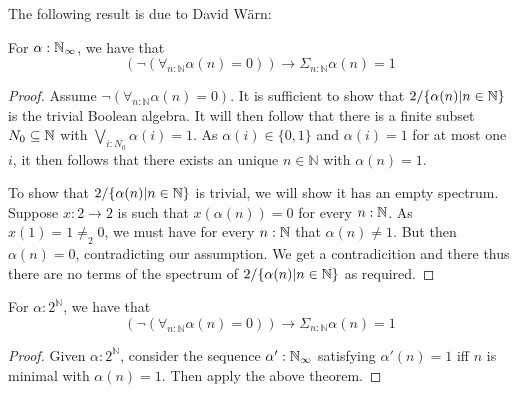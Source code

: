 The following result is due to David W\"arn:
\begin{theorem}\label{MarkovPrincipleThm}
  For $\alpha:\mathbb{N}_{\infty}$, we have that 
  \begin{equation}
    (\neg (\forall_{n:\mathbb N} \alpha (n)= 0)) \to \Sigma_{n:\mathbb N} \alpha (n)= 1
  \end{equation}
\end{theorem}
\begin{proof}
  Assume $\neg (\forall_{n:\mathbb N} \alpha (n)= 0)$.
  It is sufficient to show that $2/\{\alpha(n)|n\in\mathbb{N}\}$ is the trivial Boolean algebra. 
  It will then follow that there is a finite subset $N_0\subseteq \mathbb{N}$ 
  with $\bigvee_{i:N_0} \alpha(i) = 1$.
  As $\alpha(i) \in \{0,1\}$ and $\alpha(i) = 1$ for at most one $i$, it then follows that 
  there exists an unique $n\in\mathbb N$ with $\alpha(n) = 1$. 

  To show that $2/\{\alpha(n)|n\in\mathbb{N}\}$ is trivial, we will show it has an empty spectrum. 
  Suppose $x: 2 \to 2$ is such that $x(\alpha(n)) = 0$ for every $n:\mathbb{N}$. 
  As $x(1) = 1\neq_2 0$, we must have for every $n:\mathbb{N}$ that $\alpha(n) \neq 1$. 
  But then $\alpha(n) = 0$, contradicting our assumption. 
  We get a contradicition and there thus there are no terms of the spectrum of $2/\{\alpha(n)|n\in\mathbb{N}\}$ as required. 
\end{proof}
\begin{corollary}
  For $\alpha:2^\mathbb N$, we have that 
  \begin{equation}
    (\neg (\forall_{n:\mathbb N} \alpha (n)= 0)) \to \Sigma_{n:\mathbb N} \alpha (n)= 1
  \end{equation}
\end{corollary}
\begin{proof}
  Given $\alpha:2^\mathbb N$, consider the sequence $\alpha':\mathbb{N}_{\infty}$ satisfying $\alpha'(n) = 1$ iff 
  $n$ is minimal with $\alpha(n) = 1$. Then apply the above theorem.
\end{proof}

